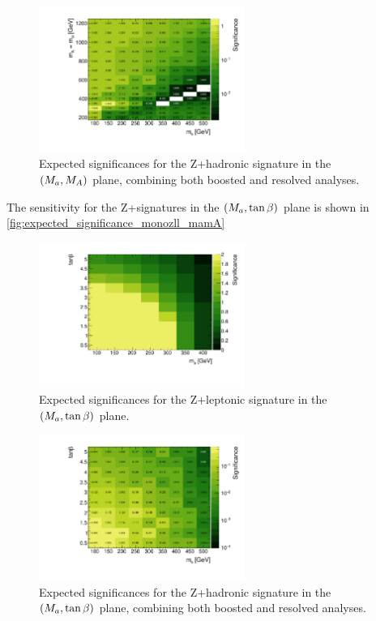 \begin{figure}
\centering
\includegraphics[width=0.6\textwidth]{texinputs/04_grid/figures/monoz/hadronic/grid_mA_ma_sum_bin100_sign_type3_bkg_uncert_0p10.pdf}
\caption{Expected significances for the Z+\MET hadronic signature in the $(M_{a},M_{A})$ plane, combining both boosted and resolved analyses.} 
\label{fig:expected_significance_monozhad_mamA}
\end{figure}

The sensitivity for the Z+\MET signatures in the $(M_{a},\tan\beta)$ plane is shown in \autoref{fig:expected_significance_monozll_mamA} 

\begin{figure}
\centering
\includegraphics[width=0.6\textwidth]{texinputs/04_grid/figures/monoz/leptonic/tanbma_Significance_ll.pdf}
\caption{Expected significances for the Z+\MET leptonic signature in the $(M_{a},\tan\beta)$ plane.} 
\label{fig:expected_significance_monozll_mamA}
\end{figure}

\begin{figure}
\centering
\includegraphics[width=0.6\textwidth]{texinputs/04_grid/figures/monoz/hadronic/grid_tanb_ma_sum_bin100_sign_type3_bkg_uncert_0p10.pdf}
\caption{Expected significances for the Z+\MET hadronic signature in the $(M_{a},\tan\beta)$ plane, combining both boosted and resolved analyses.} 
\label{fig:expected_significance_monozhad_mamA}
\end{figure}

